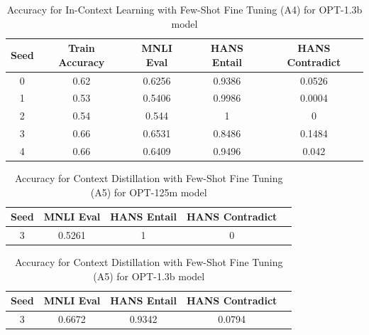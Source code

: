 \documentclass[10pt,twocolumn,letterpaper]{article}
\begin{document}
\begin{table}[h!]
\begin{center}
\begin{tabular}{|c|c|c|c|c|}
\hline
\textbf{Seed} & \textbf{Train Accuracy} & \textbf{MNLI Eval} & \textbf{HANS Entail} & \textbf{HANS Contradict} \\
\hline
\hline
0 & 0.62 & 0.6256 & 0.9386 & 0.0526 \\
1 & 0.53 & 0.5406 & 0.9986 & 0.0004 \\
2 & 0.54 & 0.544 & 1 & 0 \\
3 & 0.66 & 0.6531 & 0.8486 & 0.1484 \\
4 & 0.66 & 0.6409 & 0.9496 & 0.042 \\
\hline
\end{tabular}
\end{center}
\caption{Accuracy for In-Context Learning with Few-Shot Fine Tuning (A4) for OPT-1.3b model}
\end{table}

			
			
			
			
			
			

\begin{table}[h!]
\begin{center}
\begin{tabular}{|c|c|c|c|c|}
\hline
\textbf{Seed} & \textbf{MNLI Eval} & \textbf{HANS Entail} & \textbf{HANS Contradict} \\
\hline
\hline
3 & 0.5261 & 1 & 0 \\
\hline
\end{tabular}
\end{center}
\caption{Accuracy for Context Distillation with Few-Shot Fine Tuning (A5) for OPT-125m model}
\end{table}

\begin{table}[h!]
\begin{center}
\begin{tabular}{|c|c|c|c|c|}
\hline
\textbf{Seed} & \textbf{MNLI Eval} & \textbf{HANS Entail} & \textbf{HANS Contradict} \\
\hline
\hline
3 & 0.6672 & 0.9342 & 0.0794 \\
\hline
\end{tabular}
\end{center}
\caption{Accuracy for Context Distillation with Few-Shot Fine Tuning (A5) for OPT-1.3b model}
\end{table}
\end{document}

